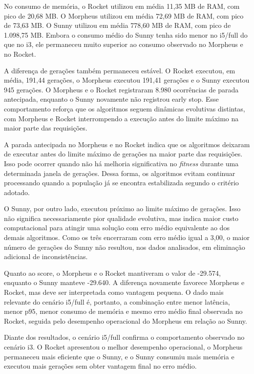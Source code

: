 No consumo de memória, o Rocket utilizou em média 11,35 MB de RAM, com pico de 20,68 MB. O Morpheus utilizou em média 72,69 MB de RAM, com pico de 73,63 MB. O Sunny utilizou em média 778,60 MB de RAM, com pico de 1.098,75 MB. Embora o consumo médio do Sunny tenha sido menor no i5/full do que no i3, ele permaneceu muito superior ao consumo observado no Morpheus e no Rocket.

A diferença de gerações também permaneceu estável. O Rocket executou, em média, 191,44 gerações, o Morpheus executou 191,41 gerações e o Sunny executou 945 gerações. O Morpheus e o Rocket registraram 8.980 ocorrências de parada antecipada, enquanto o Sunny novamente não registrou early stop. Esse comportamento reforça que os algoritmos seguem dinâmicas evolutivas distintas, com Morpheus e Rocket interrompendo a execução antes do limite máximo na maior parte das requisições.

A parada antecipada no Morpheus e no Rocket indica que os algoritmos deixaram de executar antes do limite máximo de gerações na maior parte das requisições. Isso pode ocorrer quando não há melhoria significativa no \textit{fitness} durante uma determinada janela de gerações. Dessa forma, os algoritmos evitam continuar processando quando a população já se encontra estabilizada segundo o critério adotado.

O Sunny, por outro lado, executou próximo ao limite máximo de gerações. Isso não significa necessariamente pior qualidade evolutiva, mas indica maior custo computacional para atingir uma solução com erro médio equivalente ao dos demais algoritmos. Como os três encerraram com erro médio igual a 3,00, o maior número de gerações do Sunny não resultou, nos dados analisados, em eliminação adicional de inconsistências.

Quanto ao score, o Morpheus e o Rocket mantiveram o valor de -29.574, enquanto o Sunny manteve -29.640. A diferença novamente favorece Morpheus e Rocket, mas deve ser interpretada como vantagem pequena. O dado mais relevante do cenário i5/full é, portanto, a combinação entre menor latência, menor p95, menor consumo de memória e mesmo erro médio final observada no Rocket, seguida pelo desempenho operacional do Morpheus em relação ao Sunny.

Diante dos resultados, o cenário i5/full confirma o comportamento observado no cenário i3. O Rocket apresentou o melhor desempenho operacional, o Morpheus permaneceu mais eficiente que o Sunny, e o Sunny consumiu mais memória e executou mais gerações sem obter vantagem final no erro médio.

